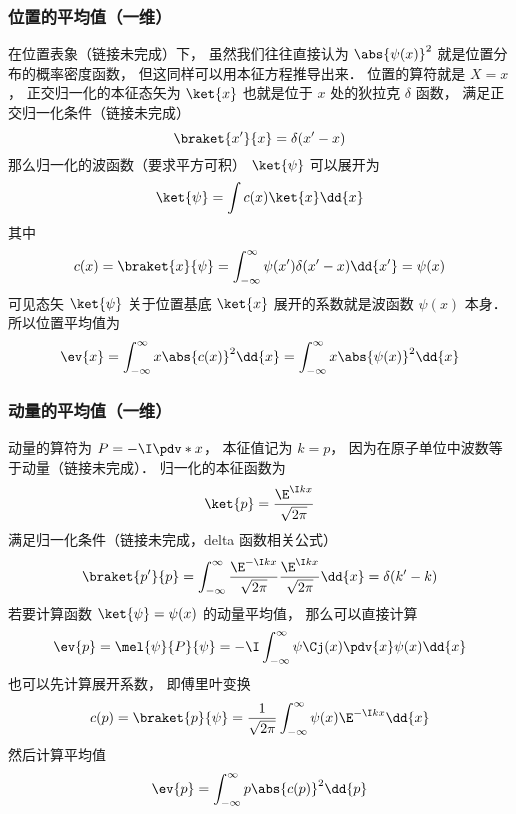 \subsubsection{位置的平均值（一维）}
在位置表象（链接未完成）下， 虽然我们往往直接认为 $\abs{\psi(x)}^2$ 就是位置分布的概率密度函数， 但这同样可以用本征方程推导出来． 位置的算符就是 $X = x$， 正交归一化的本征态矢为 $\ket{x}$ 也就是位于 $x$ 处的狄拉克 $\delta$ 函数， 满足正交归一化条件（链接未完成）
\begin{equation}
\braket{x'}{x} = \delta(x'-x)
\end{equation}
那么归一化的波函数（要求平方可积） $\ket{\psi}$ 可以展开为
\begin{equation}
\ket{\psi} = \int c(x) \ket{x}\dd{x}
\end{equation}
其中
\begin{equation}
c(x) = \braket{x}{\psi} = \int_{-\infty}^\infty \psi(x')\delta(x'-x)\dd{x'} = \psi(x)
\end{equation}
可见态矢 $\ket{\psi}$ 关于位置基底 $\ket{x}$ 展开的系数就是波函数 $\psi(x)$ 本身． 所以位置平均值为
\begin{equation}
\ev{x} = \int_{-\infty}^\infty x \abs{c(x)}^2 \dd{x} = \int_{-\infty}^\infty x \abs{\psi(x)}^2 \dd{x}
\end{equation}


\subsubsection{动量的平均值（一维）}
动量的算符为 $P = -\I\pdv*{x}$， 本征值记为 $k = p$， 因为在原子单位中波数等于动量（链接未完成）． 归一化的本征函数为
\begin{equation}
\ket{p} = \frac{\E^{\I k x}}{\sqrt{2\pi}}
\end{equation}
满足归一化条件（链接未完成，delta 函数相关公式）
\begin{equation}
\braket{p'}{p} = \int_{-\infty}^{\infty} \frac{\E^{-\I k x}}{\sqrt{2\pi}} \frac{\E^{\I k x}}{\sqrt{2\pi}} \dd{x} = \delta(k' - k)
\end{equation}
若要计算函数 $\ket{\psi} = \psi(x)$ 的动量平均值， 那么可以直接计算
\begin{equation}
\ev{p} = \mel{\psi}{P}{\psi} = -\I\int_{-\infty}^{\infty} \psi\Cj(x) \pdv{x} \psi(x) \dd{x}
\end{equation}
也可以先计算展开系数， 即傅里叶变换
\begin{equation}
c(p) = \braket{p}{\psi} = \frac{1}{\sqrt{2\pi}}\int_{-\infty}^{\infty} \psi(x)\E^{-\I kx} \dd{x}
\end{equation}
然后计算平均值
\begin{equation}
\ev{p} = \int_{-\infty}^{\infty} p \abs{c(p)}^2\dd{p}
\end{equation}

